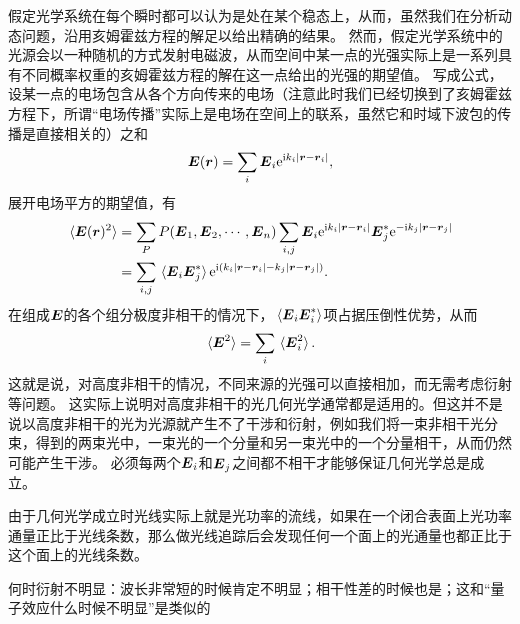 假定光学系统在每个瞬时都可以认为是处在某个稳态上，从而，虽然我们在分析动态问题，沿用亥姆霍兹方程的解足以给出精确的结果。
然而，假定光学系统中的光源会以一种随机的方式发射电磁波，从而空间中某一点的光强实际上是一系列具有不同概率权重的亥姆霍兹方程的解在这一点给出的光强的期望值。
写成公式，设某一点的电场包含从各个方向传来的电场（注意此时我们已经切换到了亥姆霍兹方程下，所谓“电场传播”实际上是电场在空间上的联系，虽然它和时域下波包的传播是直接相关的）之和
\begin{equation}
    \vb*{E}(\vb*{r}) = \sum_i \vb*{E}_i \mathrm{e}^{\mathrm{i} k_i \abs*{\vb*{r} - \vb*{r}_i}},
\end{equation}
展开电场平方的期望值，有
\begin{equation}
    \begin{aligned}
        \expval*{\vb*{E}(\vb*{r})^2} &= \sum_P P(\vb*{E}_1, \vb*{E}_2, \cdots, \vb*{E}_n) \sum_{i, j} \vb*{E}_i \mathrm{e}^{\mathrm{i} k_i \abs*{\vb*{r} - \vb*{r}_i}} \vb*{E}_j^* \mathrm{e}^{- \mathrm{i} k_j \abs*{\vb*{r} - \vb*{r}_j}}  \\
        &= \sum_{i, j} \expval*{\vb*{E}_i \vb*{E}_j^*} \mathrm{e}^{\mathrm{i} (k_i \abs*{\vb*{r} - \vb*{r}_i} - k_j \abs*{\vb*{r} - \vb*{r}_j})}.
    \end{aligned}
\end{equation}
在组成$\vb*{E}$的各个组分极度非相干的情况下，$\expval*{\vb*{E}_i \vb*{E}_i^*}$项占据压倒性优势，从而
\begin{equation}
    \expval*{\vb*{E}^2} = \sum_i \expval*{\vb*{E}_i^2}.
\end{equation}
这就是说，对高度非相干的情况，不同来源的光强可以直接相加，而无需考虑衍射等问题。
这实际上说明对高度非相干的光几何光学通常都是适用的。但这并不是说以高度非相干的光为光源就产生不了干涉和衍射，例如我们将一束非相干光分束，得到的两束光中，一束光的一个分量和另一束光中的一个分量相干，从而仍然可能产生干涉。
必须每两个$\vb*{E}_i$和$\vb*{E}_j$之间都不相干才能够保证几何光学总是成立。

由于几何光学成立时光线实际上就是光功率的流线，如果在一个闭合表面上光功率通量正比于光线条数，那么做光线追踪后会发现任何一个面上的光通量也都正比于这个面上的光线条数。

何时衍射不明显：波长非常短的时候肯定不明显；相干性差的时候也是；这和“量子效应什么时候不明显”是类似的

